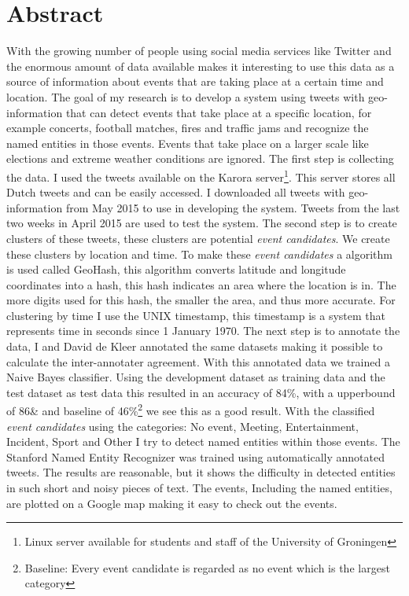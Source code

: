 \documentclass[
10pt, %
a4paper, %
oneside, %
headinclude,footinclude, %
BCOR5mm, %
]{scrartcl}
\begin{document}
\section*{Abstract} %
With the growing number of people using social media services like Twitter and the enormous amount of data available makes it interesting to use this data as a source of information about events that are taking place at a certain time and location. The goal of my research is to develop a system using tweets with geo-information that can detect events that take place at a specific location, for example concerts, football matches, fires and traffic jams and recognize the named entities in those events. Events that take place on a larger scale like elections and extreme weather conditions are ignored. 
\vl
The first step is collecting the data. I used the tweets available on the Karora server\footnote{Linux server available for students and staff of the University of Groningen}. This server stores all Dutch tweets and can be easily accessed. I downloaded all tweets with geo-information from May 2015 to use in developing the system. Tweets from the last two weeks in April 2015 are used to test the system.
\vl
The second step is to create clusters of these tweets, these clusters are potential \textit{event candidates}. We create these clusters by location and time. To make these \textit{event candidates} a algorithm is used called GeoHash, this  algorithm converts latitude and longitude coordinates into a hash, this hash indicates an area where the location is in. The more digits used for this hash, the smaller the area, and thus more accurate. For clustering by time I use the UNIX timestamp, this timestamp is a system that represents time in seconds since 1 January 1970.
\vl
The next step is to annotate the data, I and David de Kleer annotated the same datasets making it possible to calculate the inter-annotater agreement. With this annotated data we trained a Naive Bayes classifier. Using the development dataset as training data and the test dataset as test data this resulted in an accuracy of 84\%, with a upperbound of 86\& and baseline of 46\%\footnote{Baseline: Every event candidate is regarded as no event which is the largest category} we see this as a good result.
\vl
With the classified \textit{event candidates} using the categories: No event, Meeting, Entertainment, Incident, Sport and Other I try to detect named entities within those events. The Stanford Named Entity Recognizer was trained using automatically annotated tweets. The results are reasonable, but it shows the difficulty in detected entities in such short and noisy pieces of text.
\vl
The events, Including the named entities, are plotted on a Google map making it easy to check out the events.
\end{document}

